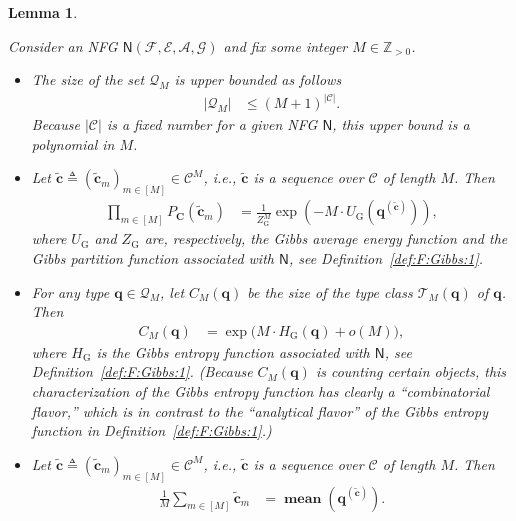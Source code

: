 \documentclass[journal, twocolumn]{IEEEtran}
\renewcommand{\mathbf}[1]{{\bm{#1}}}
\newcommand{\ie}{\emph{i.e.}}
\renewcommand{\leq}{\leqslant}
\newcommand{\Z}{\mathbb{Z}}
\newcommand{\Zpp}{\Z_{>0}}
\newcommand{\vect}[1]{\mathbf{#1}}
\newcommand{\code}[1]{\mathcal{#1}}
\newcommand{\set}[1]{\mathcal{#1}}
\newcommand{\graph}[1]{\mathsf{#1}}
\newcommand{\defeq}{\triangleq}
\newcommand{\codeCedge}{\code{C}}
\newcommand{\setA}{\set{A}}
\newcommand{\setE}{\set{E}}
\newcommand{\setF}{\set{F}}
\newcommand{\setG}{\set{G}}
\newcommand{\vC}{\vect{C}}
\newcommand{\vq}{\vect{q}}
\newcommand{\graphN}{\graph{N}}
\newcommand{\card}[1]{\left\lvert #1 \right\rvert}
\newcommand{\?}{\mathrm{?}}
\newcommand{\meanvect}{\operatorname{\mathbf{mean}}}
\newcommand{\tvc}{\vect{\tilde{c}}}
\newcommand{\vcsample}[1]{\tvc_{#1}}
\newcommand{\vcsampletot}{\tvc}
\newcommand{\vqcsample}{\vect{q}^{(\vcsampletot)}}
\newcommand{\setQsample}[1]{\set{Q}_{#1}}
\newcommand{\UGibbs}{U_{\mathrm{G}}}
\newcommand{\HGibbs}{H_{\mathrm{G}}}
\newcommand{\ZGibbs}{Z_{\mathrm{G}}}
\newtheorem{Lemma}{Lemma}
\begin{document}
\begin{Lemma}
  \label{lemma:method:of:types:properties:1}
  
  Consider an NFG $\graphN(\setF,\setE, \setA, \setG)$ and fix some integer $M
  \in \Zpp$.
  
  \begin{itemize}

  \item The size of the set $\setQsample{M}$ is upper bounded as follows
    \begin{align*}
      \card{\setQsample{M}}
        &\leq (M+1)^{\card{\codeCedge}}.
    \end{align*}
    Because $\card{\codeCedge}$ is a fixed number for a given NFG $\graphN$,
    this upper bound is a polynomial in $M$.

  \item Let $\vcsampletot \defeq ( \vcsample{m} )_{m \in [M]} \in \codeCedge^M$,
    \ie, $\vcsampletot$ is a sequence over $\codeCedge$ of length $M$. Then
    \begin{align*}
      \prod_{m \in [M]}
        P_{\vC}(\vcsample{m})
        &= \frac{1}{\ZGibbs^M}
           \exp
             \left(
               -
               M
               \cdot
               \UGibbs\left( \vqcsample \right)
             \right),
    \end{align*}
    where $\UGibbs$ and $\ZGibbs$ are, respectively, the Gibbs average energy
    function and the Gibbs partition function associated with $\graphN$, see
    Definition~\ref{def:F:Gibbs:1}.

  \item For any type $\vq \in \setQsample{M}$, let $C_M(\vq)$ be the size of
    the type class $\set{T}_M(\vq)$ of $\vq$. Then
    \begin{align*}
      C_M(\vq)
        &= \exp
             \big(
               M \cdot \HGibbs(\vq)
               +
               o(M)
             \big),
    \end{align*}
    where $\HGibbs$ is the Gibbs entropy function associated with $\graphN$,
    see Definition~\ref{def:F:Gibbs:1}. (Because $C_M(\vq)$ is counting
    certain objects, this characterization of the Gibbs entropy function has
    clearly a ``combinatorial flavor,'' which is in contrast to the
    ``analytical flavor'' of the Gibbs entropy function in
    Definition~\ref{def:F:Gibbs:1}.)

  \item Let $\vcsampletot \defeq ( \vcsample{m} )_{m \in [M]} \in \codeCedge^M$,
    \ie, $\vcsampletot$ is a sequence over $\codeCedge$ of length $M$. Then
    \begin{align*}
      \frac{1}{M}
      \sum_{m \in [M]}
        \vcsample{m}
        &= \meanvect\left( \vqcsample \right).
    \end{align*}

  \end{itemize}
\end{Lemma}
\end{document}
